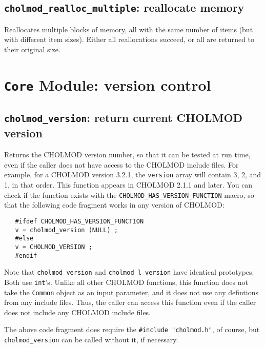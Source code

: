 \documentclass[11pt]{article}
\begin{document}
\newpage \subsection{{\tt cholmod\_realloc\_multiple}: reallocate memory}


Reallocates multiple blocks of memory, all with the same number of items
(but with different item sizes).  Either all reallocations succeed,
or all are returned to their original size.

\newpage \section{{\tt Core} Module: version control}

\subsection{{\tt cholmod\_version}: return current CHOLMOD version}


Returns the CHOLMOD version number, so that it can be tested at run time, even
if the caller does not have access to the CHOLMOD include files.  For example,
for a CHOLMOD version 3.2.1, the {\tt version} array will contain 3, 2, and 1,
in that order.  This function appears in CHOLMOD 2.1.1 and later.  You can
check if the function exists with the {\tt CHOLMOD\_HAS\_VERSION\_FUNCTION}
macro, so that the following code fragment works in any version of CHOLMOD:

\begin{verbatim}
   #ifdef CHOLMOD_HAS_VERSION_FUNCTION
   v = cholmod_version (NULL) ;
   #else
   v = CHOLMOD_VERSION ;
   #endif
\end{verbatim}

Note that {\tt cholmod\_version} and {\tt cholmod\_l\_version} have identical
prototypes.  Both use {\tt int}'s.  Unlike all other CHOLMOD functions, this
function does not take the {\tt Common} object as an input parameter, and it
does not use any defintions from any include files.  Thus, the caller can
access this function even if the caller does not include any CHOLMOD include
files.

The above code fragment does require the {\tt \#include "cholmod.h"},
of course, but {\tt cholmod\_version} can be called without it, if necessary.
\end{document}
